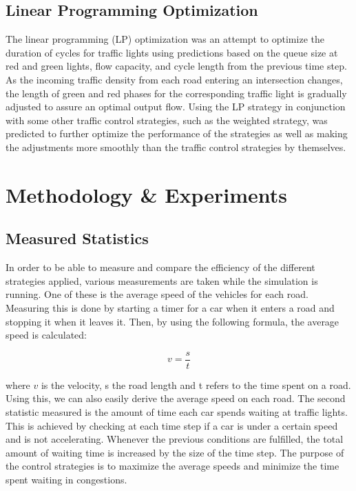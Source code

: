 \documentclass[10pt]{article}
\begin{document}
\subsection{Linear Programming Optimization}
The linear programming (LP) optimization was an attempt to optimize the duration of cycles for traffic lights using predictions based on the queue size at red and green lights, flow capacity, and cycle length from the previous time step.  As the incoming traffic density from each road entering an intersection changes, the length of green and red phases for the corresponding traffic light is gradually adjusted to assure an optimal output flow.  Using the LP strategy in conjunction with some other traffic control strategies, such as the weighted strategy, was predicted to further optimize the performance of the strategies as well as making the adjustments more smoothly than the traffic control strategies by themselves.

\section{Methodology \& Experiments}
\label{sec:experiments}

\subsection{Measured Statistics}
In order to be able to measure and compare the efficiency of the different strategies applied, various measurements are taken while the simulation is running. One of these is the average speed of the vehicles for each road. Measuring this is done by starting a timer for a car when it enters a road and stopping it when it leaves it. Then, by using the following formula, the average speed is calculated:   

\begin{equation}
	v = \frac{s}{t}
\end{equation}

where $v$ is the velocity, s the road length and t refers to the time spent on a road. Using this, we can also easily derive the average speed on each road. The second statistic measured is the amount of time each car spends waiting at traffic lights. This is achieved by checking at each time step if a car is under a certain speed and is not accelerating. Whenever the previous conditions are fulfilled, the total amount of waiting time is increased by the size of the time step. The purpose of the control strategies is to maximize the average speeds and minimize the time spent waiting in congestions.
\end{document}

